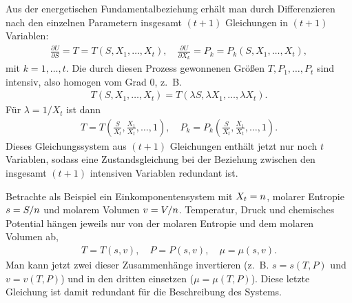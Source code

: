 Aus der energetischen Fundamentalbeziehung erhält man durch Differenzieren nach den einzelnen Parametern insgesamt $(t+1)$ Gleichungen in $(t+1)$ Variablen:
\begin{align*}
    \frac{\partial U}{\partial S} = T = T(S,X_1,\ldots ,X_t), \quad
    \frac{\partial U}{\partial X_k} =P_k = P_k(S,X_1,\ldots ,X_t),
\end{align*}
mit $k=1,\dots,t$. Die durch diesen Prozess gewonnenen Größen $T,P_1,\ldots,P_t$ sind intensiv, also homogen vom Grad $0$, z.~B.
\begin{align*}
    T(S,X_1,\ldots ,X_t)=T(\lambda S,\lambda X_1,\ldots ,\lambda X_t).
\end{align*}
Für $\lambda=1/X_t$ ist dann
\begin{align*}
    T = T\left(\frac{S}{X_t},\frac{X_1}{X_t},\ldots ,1\right), \quad P_k=P_k\left(\frac{S}{X_t},\frac{X_1}{X_t},\ldots ,1\right).
\end{align*}
Dieses Gleichungssystem aus $(t+1)$ Gleichungen enthält jetzt nur noch $t$ Variablen, sodass eine Zustandsgleichung bei der Beziehung zwischen den insgesamt $(t+1)$ intensiven Variablen redundant ist.

Betrachte als Beispiel ein Einkomponentensystem mit $X_t=n$, molarer Entropie $s=S/n$ und molarem Volumen $v=V/n$. Temperatur, Druck und chemisches Potential hängen jeweils nur von der molaren Entropie und dem molaren Volumen ab,
\begin{align*}
    T=T(s,v), \quad P=P(s,v), \quad \mu=\mu(s,v).
\end{align*}
Man kann jetzt zwei dieser Zusammenhänge invertieren (z.~B. $s=s(T,P)$ und $v=v(T,P)$) und in den dritten einsetzen ($\mu=\mu(T,P)$). Diese letzte Gleichung ist damit redundant für die Beschreibung des Systems.

